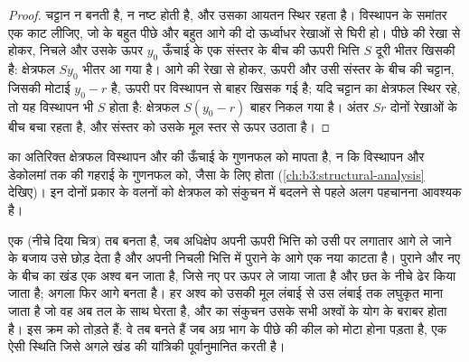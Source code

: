 \begin{proof}
चट्टान न बनती है, न नष्ट होती है, और उसका आयतन स्थिर रहता है। विस्थापन के समांतर एक काट लीजिए,
जो  के बहुत पीछे और बहुत आगे की दो ऊर्ध्वाधर रेखाओं से घिरी हो।
पीछे की रेखा से होकर, निचले  और उसके ऊपर $y_0$ ऊँचाई के एक संस्तर के बीच की ऊपरी भित्ति
$S$ दूरी भीतर खिसकी है: क्षेत्रफल $Sy_0$ भीतर आ गया है। आगे की रेखा से होकर,
ऊपरी  और उसी संस्तर के बीच की चट्टान, जिसकी मोटाई $y_0 - r$ है,
ऊपरी  पर विस्थापन से बाहर खिसक गई है;
यदि चट्टान का क्षेत्रफल स्थिर रहे, तो यह विस्थापन भी $S$ होता है: क्षेत्रफल $S(y_0 - r)$ बाहर निकल गया है।
अंतर $Sr$ दोनों रेखाओं के बीच बचा रहता है,
और संस्तर को उसके मूल स्तर से ऊपर उठाता है।
\end{proof}

 का अतिरिक्त क्षेत्रफल विस्थापन और  की ऊँचाई के गुणनफल को मापता है,
न कि विस्थापन और डेकोलमां तक की गहराई के गुणनफल को, जैसा  के लिए होता
(\cref{ch:b3:structural-analysis} देखिए)। इन दोनों प्रकार के वलनों को
क्षेत्रफल को संकुचन में बदलने से पहले अलग पहचानना आवश्यक है।


एक  (नीचे दिया चित्र) तब बनता है, जब अधिक्षेप अपनी ऊपरी भित्ति को उसी  पर
लगातार आगे ले जाने के बजाय उसे छोड़ देता है और अपनी निचली भित्ति में पुराने  के आगे एक नया  काटता है।
पुराने और नए  के बीच का खंड एक अश्व बन जाता है, जिसे नए  पर ऊपर ले जाया जाता है
और छत के नीचे ढेर किया जाता है; अगला  फिर आगे बनता है।
हर अश्व को उसकी मूल लंबाई से उस लंबाई तक लघुकृत माना जाता है जो वह अब तल के साथ घेरता है,
और  का संकुचन उसके सभी अश्वों के योग के बराबर होता है।
 इस क्रम को तोड़ते हैं: वे तब बनते हैं
जब अग्र भाग के पीछे की कील को मोटा होना पड़ता है,
एक ऐसी स्थिति जिसे अगले खंड की यांत्रिकी पूर्वानुमानित करती है।


